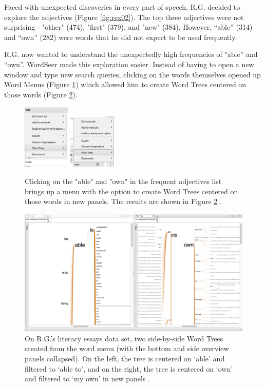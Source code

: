 \documentclass{sig-alternate}
\begin{document}
Faced with unexpected discoveries in every part of speech, R.G. decided to explore the adjectives (Figure \ref{fig:rex02}). The top three adjectives were not surprising - "other" (474), "first" (379), and "new" (384).  However,  ``able'' (314) and ``own'' (282) were words that he did not expect to be used frequently.

R.G. now wanted to understand the unexpectedly high frequencies of "able'' and ``own''. WordSeer made this exploration easier. Instead of having to open a new window and type new search queries, clicking on the words themselves opened up Word Menus (Figure \ref{fig:rex03}) which allowed him to create Word Trees centered on those words (Figure \ref{fig:rex04}).   
\begin{figure}[h!]
\includegraphics[width=0.2\textwidth]{fig/rex/03.png}
\includegraphics[width=0.2\textwidth]{fig/rex/03b.png}
\caption{Clicking on the "able" and "own" in the frequent adjectives list brings up a menu with the option to create Word Trees centered on those words in new panels. The results are shown in Figure \ref{fig:rex04} \label{fig:rex03}.}
\end{figure}

\begin{figure}[h!]
\includegraphics[width=\textwidth]{fig/rex/04.png}
\caption{ On R.G.'s literacy essays data set, two side-by-side Word Trees created from the word menu (with the bottom and side overview panels collapsed). On the left, the tree is centered on `able' and filtered to `able to', and on the right, the tree is centered on  `own' and filtered to `my own' in new panels \label{fig:rex04}.}
\end{figure}
\end{document}
